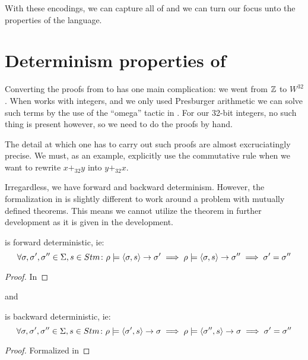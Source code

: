 With these encodings, we can capture all of \januso{} and we can turn
our focus unto the properties of the language.

\section{Determinism properties of \januso{}}

Converting the proofs from \janusz{} to \januso{} has one main
complication: we went from $\mathbb{Z}$ to $W^{32}$. When \coq{} works with
integers, and we only used Presburger
arithmetic\cite{cooper:theorem} we can solve such terms
by the use of the ``omega'' tactic in \coq{}. For our 32-bit integers,
no such thing is present however, so we need to do the proofs by hand.

The detail at which one has to carry out such proofs are almost
excruciatingly precise. We must, as an example, explicitly use the
commutative rule when we want to rewrite $x +_{32} y$ into $y +_{32}
x$.

Irregardless, we have forward and backward determinism. However, the
formalization in \coq{} is slightly different to work around a problem
with mutually defined theorems. This means we cannot utilize the
theorem in further development as it is given in the development.
\begin{thm}
\label{thm:j1-fwd-det}
  \januso{} is forward deterministic, ie:
  \begin{equation*}
    \forall \sigma, \sigma', \sigma'' \in \Sigma, s \in Stm \colon
    \rho |= \langle \sigma, s \rangle -> \sigma' \implies \rho |= \langle \sigma, s \rangle -> \sigma'' \implies \sigma' = \sigma''
  \end{equation*}
\end{thm}
\begin{proof}
  In \coq{}
\end{proof}
and
\begin{thm}
\label{thm:j1-bwd-det}
  \januso{} is backward deterministic, ie:
  \begin{equation*}
    \forall \sigma, \sigma', \sigma'' \in \Sigma, s \in Stm \colon
    \rho |= \langle \sigma', s \rangle -> \sigma \implies \rho |= \langle \sigma'', s \rangle -> \sigma \implies \sigma' = \sigma''
  \end{equation*}
\end{thm}
\begin{proof}
  Formalized in \coq{}
\end{proof}

